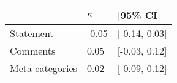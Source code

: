 \begin{tabular}{lll}
\hline
 & $\kappa$ & [95\% CI]  \\
\hline
Statement & -0.05 & [-0.14, 0.03] \\
Comments & 0.05 & [-0.03, 0.12] \\
Meta-categories & 0.02 & [-0.09, 0.12] \\
\hline
\end{tabular}
